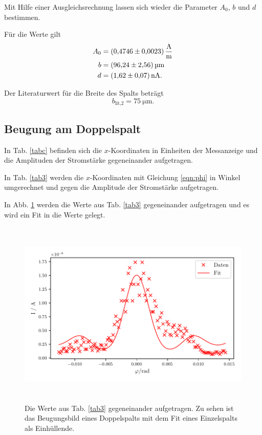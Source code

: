 \noindent Mit Hilfe einer Ausgleichsrechnung lassen sich wieder die Parameter $A_0$, $b$ und $d$ bestimmen. 

\noindent Für die Werte gilt
\begin{align*}
    A_0 &= \SI{0.4746 (023)}{\ampere\per\meter} \\
    b &= \SI{96.24 \pm 2.56}{\micro\meter} \\
    d &= \SI{1.62(07)}{\nano\ampere}. 
\end{align*}

\noindent Der Literaturwert für die Breite des Spalts beträgt
\begin{equation*}
    b_\text{lit,2} = \SI{75}{\micro\meter}.
\end{equation*}


\subsection{Beugung am Doppelspalt}
In Tab. \ref{tabc} befinden sich  die $x$-Koordinaten in Einheiten der Messanzeige und die Amplituden der Stromstärke gegeneinander aufgetragen. 



\noindent In Tab. \ref{tab3} werden die $x$-Koordinaten mit Gleichung \eqref{eqn:phi} in Winkel umgerechnet und gegen die Amplitude der Stromstärke aufgetragen. 



\noindent In Abb. \ref{fig:plot3} werden die Werte aus Tab. \ref{tab3} gegeneinander aufgetragen und es wird ein Fit in die Werte gelegt. 

\begin{figure}
    \centering
    \includegraphics[width=15cm, height=9cm]{build/plot3.pdf}
    \caption{Die Werte aus Tab. \ref{tab3} gegeneinander aufgetragen.
    Zu sehen ist das Beugungsbild eines Doppelspalts mit dem Fit eines
    Einzelspalts als Einhüllende.}
    \label{fig:plot3}
\end{figure}

